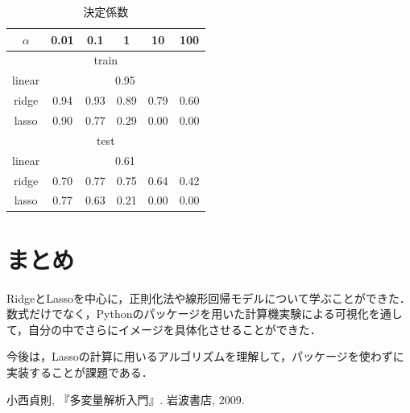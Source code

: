 \documentclass[a4paper,twocolumn]{ujarticle} %
\begin{document}
\begin{table}[H]
	\centering
	\caption{決定係数}
        	\begin{tabular}{|c|c|c|c|c|c|}
		\hline
        		$\alpha$ & 0.01 & 0.1 & 1 & 10 & 100\\ 
		\hline
		\hline
		\multicolumn{6}{|c|}{train} \\
		\hline
		linear & \multicolumn{5}{|c|}{0.95} \\
		\hline
		ridge & 0.94 & 0.93 & 0.89 & 0.79 & 0.60 \\
		\hline
		lasso & 0.90 & 0.77 & 0.29 & 0.00 & 0.00\\
		\hline
		\hline
		\multicolumn{6}{|c|}{test} \\
		\hline
		linear & \multicolumn{5}{|c|}{0.61} \\
		\hline
		ridge & 0.70 & 0.77 & 0.75 &0.64 & 0.42\\
		\hline
		lasso & 0.77 & 0.63 & 0.21 & 0.00 & 0.00 \\
		\hline
        	\end{tabular}
	\label{tab:score}
\end{table}
\section{まとめ}
RidgeとLassoを中心に，正則化法や線形回帰モデルについて学ぶことができた．数式だけでなく，Pythonのパッケージを用いた計算機実験による可視化を通して，自分の中でさらにイメージを具体化させることができた．

今後は，Lassoの計算に用いるアルゴリズムを理解して，パッケージを使わずに実装することが課題である．
\begin{thebibliography}{9}
 小西貞則, 『多変量解析入門』. 岩波書店, 2009.
\end{thebibliography}
\end{document}
